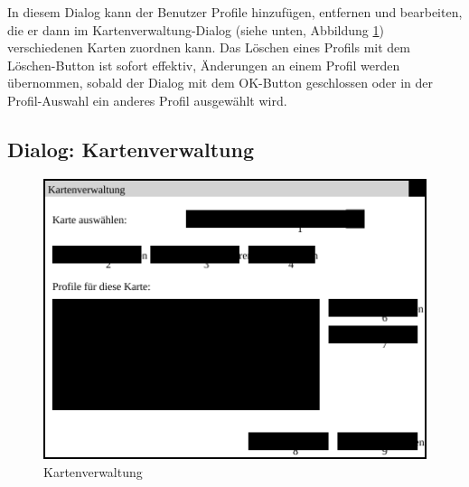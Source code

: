 \documentclass[a4paper, 11pt]{article}
\begin{document}
In diesem Dialog kann der Benutzer Profile hinzufügen, entfernen und bearbeiten, die er dann im Kartenverwaltung-Dialog (siehe unten, Abbildung \ref{fig:mockupkartenverwaltung}) verschiedenen Karten zuordnen kann. Das Löschen eines Profils mit dem Löschen-Button ist sofort effektiv, Änderungen an einem Profil werden übernommen, sobald der Dialog mit dem OK-Button geschlossen oder in der Profil-Auswahl ein anderes Profil ausgewählt wird.

\subsection{Dialog: Kartenverwaltung}
\begin{figure}[H]
\centering
\includegraphics[width=0.7\linewidth]{Kartenverwaltung}
\caption{Kartenverwaltung}
\label{fig:mockupkartenverwaltung}
\end{figure}
\end{document}
